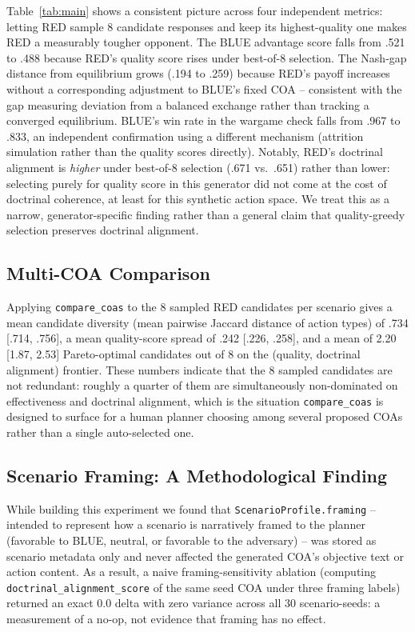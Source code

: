 \documentclass[sigconf]{acmart}
\begin{document}
Table~\ref{tab:main} shows a consistent picture across four independent metrics: letting RED sample 8 candidate responses and keep its highest-quality one makes RED a measurably tougher opponent. The BLUE advantage score falls from .521 to .488 because RED's quality score rises under best-of-8 selection. The Nash-gap distance from equilibrium grows (.194 to .259) because RED's payoff increases without a corresponding adjustment to BLUE's fixed COA -- consistent with the gap measuring deviation from a balanced exchange rather than tracking a converged equilibrium. BLUE's win rate in the wargame check falls from .967 to .833, an independent confirmation using a different mechanism (attrition simulation rather than the quality scores directly). Notably, RED's doctrinal alignment is \emph{higher} under best-of-8 selection (.671 vs.\ .651) rather than lower: selecting purely for quality score in this generator did not come at the cost of doctrinal coherence, at least for this synthetic action space. We treat this as a narrow, generator-specific finding rather than a general claim that quality-greedy selection preserves doctrinal alignment.

\subsection{Multi-COA Comparison}

Applying \texttt{compare\_coas} to the 8 sampled RED candidates per scenario gives a mean candidate diversity (mean pairwise Jaccard distance of action types) of .734 [.714, .756], a mean quality-score spread of .242 [.226, .258], and a mean of 2.20 [1.87, 2.53] Pareto-optimal candidates out of 8 on the (quality, doctrinal alignment) frontier. These numbers indicate that the 8 sampled candidates are not redundant: roughly a quarter of them are simultaneously non-dominated on effectiveness and doctrinal alignment, which is the situation \texttt{compare\_coas} is designed to surface for a human planner choosing among several proposed COAs rather than a single auto-selected one.

\subsection{Scenario Framing: A Methodological Finding}

While building this experiment we found that \texttt{ScenarioProfile.framing} -- intended to represent how a scenario is narratively framed to the planner (favorable to BLUE, neutral, or favorable to the adversary) -- was stored as scenario metadata only and never affected the generated COA's objective text or action content. As a result, a naive framing-sensitivity ablation (computing \texttt{doctrinal\_alignment\_score} of the same seed COA under three framing labels) returned an exact 0.0 delta with zero variance across all 30 scenario-seeds: a measurement of a no-op, not evidence that framing has no effect.
\end{document}
